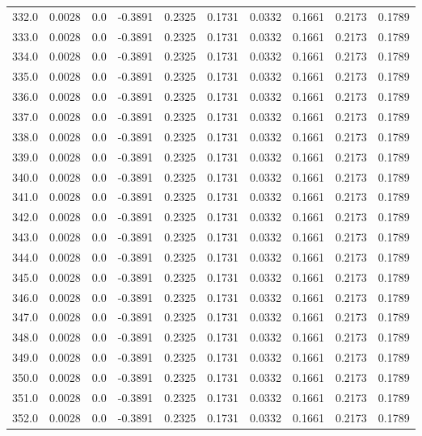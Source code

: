 \begin{longtable}{lrrrrrrrrr}
332.0 & 0.0028 & 0.0 & -0.3891 & 0.2325 & 0.1731 & 0.0332 & 0.1661 & 0.2173 & 0.1789 \\
333.0 & 0.0028 & 0.0 & -0.3891 & 0.2325 & 0.1731 & 0.0332 & 0.1661 & 0.2173 & 0.1789 \\
334.0 & 0.0028 & 0.0 & -0.3891 & 0.2325 & 0.1731 & 0.0332 & 0.1661 & 0.2173 & 0.1789 \\
335.0 & 0.0028 & 0.0 & -0.3891 & 0.2325 & 0.1731 & 0.0332 & 0.1661 & 0.2173 & 0.1789 \\
336.0 & 0.0028 & 0.0 & -0.3891 & 0.2325 & 0.1731 & 0.0332 & 0.1661 & 0.2173 & 0.1789 \\
337.0 & 0.0028 & 0.0 & -0.3891 & 0.2325 & 0.1731 & 0.0332 & 0.1661 & 0.2173 & 0.1789 \\
338.0 & 0.0028 & 0.0 & -0.3891 & 0.2325 & 0.1731 & 0.0332 & 0.1661 & 0.2173 & 0.1789 \\
339.0 & 0.0028 & 0.0 & -0.3891 & 0.2325 & 0.1731 & 0.0332 & 0.1661 & 0.2173 & 0.1789 \\
340.0 & 0.0028 & 0.0 & -0.3891 & 0.2325 & 0.1731 & 0.0332 & 0.1661 & 0.2173 & 0.1789 \\
341.0 & 0.0028 & 0.0 & -0.3891 & 0.2325 & 0.1731 & 0.0332 & 0.1661 & 0.2173 & 0.1789 \\
342.0 & 0.0028 & 0.0 & -0.3891 & 0.2325 & 0.1731 & 0.0332 & 0.1661 & 0.2173 & 0.1789 \\
343.0 & 0.0028 & 0.0 & -0.3891 & 0.2325 & 0.1731 & 0.0332 & 0.1661 & 0.2173 & 0.1789 \\
344.0 & 0.0028 & 0.0 & -0.3891 & 0.2325 & 0.1731 & 0.0332 & 0.1661 & 0.2173 & 0.1789 \\
345.0 & 0.0028 & 0.0 & -0.3891 & 0.2325 & 0.1731 & 0.0332 & 0.1661 & 0.2173 & 0.1789 \\
346.0 & 0.0028 & 0.0 & -0.3891 & 0.2325 & 0.1731 & 0.0332 & 0.1661 & 0.2173 & 0.1789 \\
347.0 & 0.0028 & 0.0 & -0.3891 & 0.2325 & 0.1731 & 0.0332 & 0.1661 & 0.2173 & 0.1789 \\
348.0 & 0.0028 & 0.0 & -0.3891 & 0.2325 & 0.1731 & 0.0332 & 0.1661 & 0.2173 & 0.1789 \\
349.0 & 0.0028 & 0.0 & -0.3891 & 0.2325 & 0.1731 & 0.0332 & 0.1661 & 0.2173 & 0.1789 \\
350.0 & 0.0028 & 0.0 & -0.3891 & 0.2325 & 0.1731 & 0.0332 & 0.1661 & 0.2173 & 0.1789 \\
351.0 & 0.0028 & 0.0 & -0.3891 & 0.2325 & 0.1731 & 0.0332 & 0.1661 & 0.2173 & 0.1789 \\
352.0 & 0.0028 & 0.0 & -0.3891 & 0.2325 & 0.1731 & 0.0332 & 0.1661 & 0.2173 & 0.1789 \\

\end{longtable}
